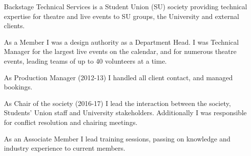\vspace{6pt}


Backstage Technical Services is a Student Union (SU) society providing technical expertise for theatre and live events to SU groups, the University and external clients.
\begin{tightemize}
    \item As a Member I was a design authority as a Department Head. I was Technical Manager for the largest live events on the calendar, and for numerous theatre events, leading teams of up to 40 volunteers at a time. 
    \item As Production Manager (2012-13) I handled all client contact, and managed bookings.
    \item As Chair of the society (2016-17) I lead the interaction between the society, Students' Union staff and University stakeholders. Additionally I was responsible for conflict resolution and chairing meetings.
    \item As an Associate Member I lead training sessions, passing on knowledge and industry experience to current members.
\end{tightemize}
\sectionsep